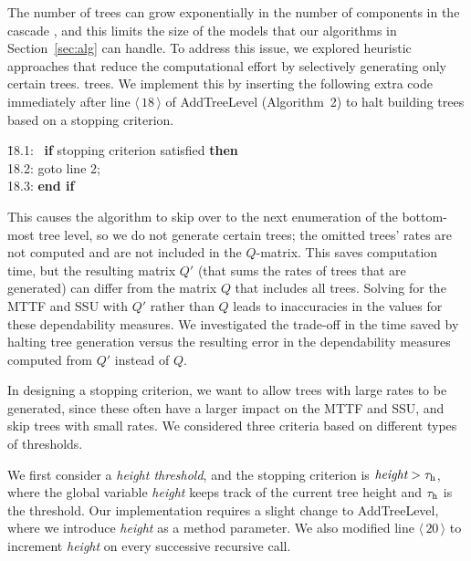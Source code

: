 \documentclass[12pt]{article}
\newcommand{\changed}[1]{#1}
\newcommand{\changed}[1]{\textcolor{red}{#1}}
\newcommand{\varName}[1]{\textrm{\it#1}}
\newcommand{\citeLine}[1]{$\langle \, #1 \, \rangle$}
\begin{document}
The number of trees can grow exponentially in the number of components in the
cascade \cite{ING:2009}, and this limits the size of the models that our %
\changed{algorithms in Section~\ref{sec:alg}}
can handle. To address this issue, we explored heuristic approaches that
reduce the computational effort by %
\changed{selectively generating only certain trees}. %
trees. We implement this by inserting the following extra code immediately
after line \citeLine{18} of
\mbox{AddTreeLevel}
\changed{(Algorithm~2)}
to
halt
\changed{building trees based} on a stopping criterion. %
\begin{tabbing}
\hspace*{1em} \=
{\small 18.1:} \ \=
\textbf{if} stopping criterion satisfied
\textbf{then}
\\
\>
{\small 18.2:}
\> \hspace*{0.5em}
goto line 2;
\\
\>
{\small 18.3:}
\> \textbf{end if}
\end{tabbing}
%
This causes the algorithm to skip over to the next enumeration of the bottom-
most tree level, so we do not generate certain trees; the omitted trees' rates
are not computed and are not included in the $Q$-matrix.
This saves computation time, but the resulting matrix $Q'$ (that sums the
rates of trees that are generated) can differ from the matrix $Q$ that
includes all trees. Solving for the MTTF and SSU with $Q'$ rather than $Q$
leads to inaccuracies in the values for these dependability measures.  We
investigated the trade-off in the time saved by halting tree generation versus
the resulting error in the dependability measures computed from $Q'$ instead
of $Q$.

In designing a stopping criterion, we want to allow trees with large rates to
be generated, since these %
\changed{often}
have a larger impact on the MTTF and SSU, and skip trees with small rates. We
considered three criteria based on different types of thresholds.


We first consider a \textit{height threshold}, and the stopping criterion is
$\varName{height} > \changed{\tau_{\textrm h}}$, where the global variable
\varName{height} keeps track of the current tree height and $\tau_{\textrm h}$
is the threshold. Our implementation requires a slight change to
\mbox{AddTreeLevel}, where we introduce \varName{height} as a method
parameter. We also modified line
\citeLine{20} to increment \varName{height}
on every successive recursive call.
\end{document}
